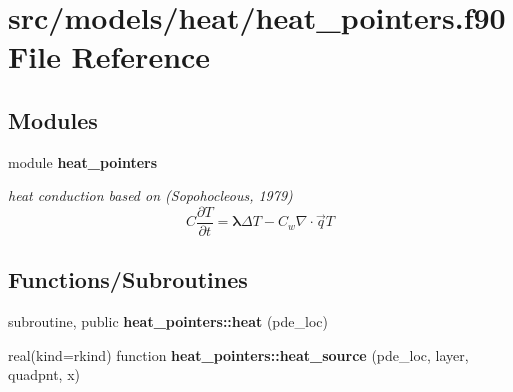 \section{src/models/heat/heat\+\_\+pointers.f90 File Reference}
\label{heat__pointers_8f90}
\subsection*{Modules}
\begin{DoxyCompactItemize}
\item 
module {\bf heat\+\_\+pointers}
\begin{DoxyCompactList}\small\item\em heat conduction based on (Sopohocleous, 1979) \[ C\frac{\partial T}{\partial t} = \mathbf{\lambda} \Delta T - C_w \nabla \cdot \vec{q} T \] \end{DoxyCompactList}\end{DoxyCompactItemize}
\subsection*{Functions/\+Subroutines}
\begin{DoxyCompactItemize}
\item 
subroutine, public {\bf heat\+\_\+pointers\+::heat} (pde\+\_\+loc)
\item 
real(kind=rkind) function {\bf heat\+\_\+pointers\+::heat\+\_\+source} (pde\+\_\+loc, layer, quadpnt, x)
\end{DoxyCompactItemize}
